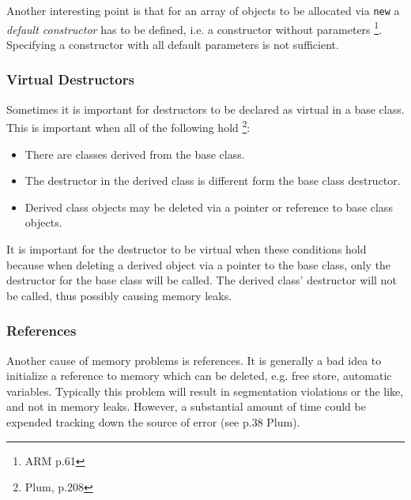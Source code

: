 Another interesting point is that for an array of objects to be allocated
via \texttt{new} a \emph{default constructor} has to be defined, i.e. a
constructor without parameters \footnote{ARM p.61}. Specifying a constructor 
with all default parameters is not sufficient.

\subsubsection{Virtual Destructors}
Sometimes it is important for destructors to be declared as virtual in a
base class. This is important when all of the following hold 
\footnote{Plum, p.208}:
\begin{itemize}
\item
There are classes derived from the base class.
\item
The destructor in the derived class is different form the base class 
destructor.
\item
Derived class objects may be deleted via a pointer or reference to base
class objects.
\end{itemize}
\noindent
It is important for the destructor to be virtual when these conditions hold
because when deleting a derived object via a pointer to the base class,
only the destructor for the base class will be called. The derived class'
destructor will not be called, thus possibly causing memory leaks.

\subsubsection{References}
Another cause of memory problems is references. It is generally a bad idea to
initialize a reference to memory which can be deleted, e.g. free store, 
automatic variables. Typically this problem will result in segmentation
violations or the like, and not in memory leaks. However, a substantial amount
of time could be expended tracking down the source of error (see p.38 Plum).

